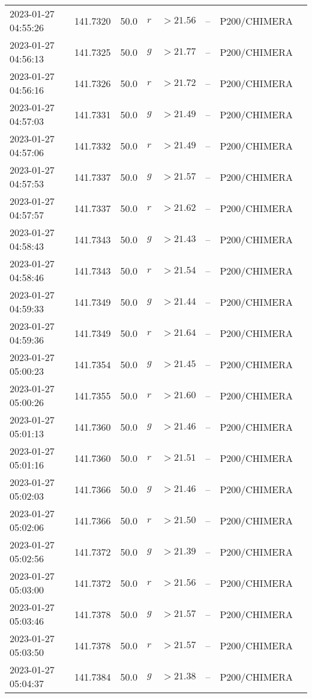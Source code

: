 \documentclass{nature_plusfigure}
\begin{document}
\begin{supplement}
\begin{center}
\begin{longtable}{llllllll}
2023-01-27 04:55:26 & 141.7320 & 50.0 & $r$ & $>21.56$ & -- & P200/CHIMERA &  \\ 
2023-01-27 04:56:13 & 141.7325 & 50.0 & $g$ & $>21.77$ & -- & P200/CHIMERA &  \\ 
2023-01-27 04:56:16 & 141.7326 & 50.0 & $r$ & $>21.72$ & -- & P200/CHIMERA &  \\ 
2023-01-27 04:57:03 & 141.7331 & 50.0 & $g$ & $>21.49$ & -- & P200/CHIMERA &  \\ 
2023-01-27 04:57:06 & 141.7332 & 50.0 & $r$ & $>21.49$ & -- & P200/CHIMERA &  \\ 
2023-01-27 04:57:53 & 141.7337 & 50.0 & $g$ & $>21.57$ & -- & P200/CHIMERA &  \\ 
2023-01-27 04:57:57 & 141.7337 & 50.0 & $r$ & $>21.62$ & -- & P200/CHIMERA &  \\ 
2023-01-27 04:58:43 & 141.7343 & 50.0 & $g$ & $>21.43$ & -- & P200/CHIMERA &  \\ 
2023-01-27 04:58:46 & 141.7343 & 50.0 & $r$ & $>21.54$ & -- & P200/CHIMERA &  \\ 
2023-01-27 04:59:33 & 141.7349 & 50.0 & $g$ & $>21.44$ & -- & P200/CHIMERA &  \\ 
2023-01-27 04:59:36 & 141.7349 & 50.0 & $r$ & $>21.64$ & -- & P200/CHIMERA &  \\ 
2023-01-27 05:00:23 & 141.7354 & 50.0 & $g$ & $>21.45$ & -- & P200/CHIMERA &  \\ 
2023-01-27 05:00:26 & 141.7355 & 50.0 & $r$ & $>21.60$ & -- & P200/CHIMERA &  \\ 
2023-01-27 05:01:13 & 141.7360 & 50.0 & $g$ & $>21.46$ & -- & P200/CHIMERA &  \\ 
2023-01-27 05:01:16 & 141.7360 & 50.0 & $r$ & $>21.51$ & -- & P200/CHIMERA &  \\ 
2023-01-27 05:02:03 & 141.7366 & 50.0 & $g$ & $>21.46$ & -- & P200/CHIMERA &  \\ 
2023-01-27 05:02:06 & 141.7366 & 50.0 & $r$ & $>21.50$ & -- & P200/CHIMERA &  \\ 
2023-01-27 05:02:56 & 141.7372 & 50.0 & $g$ & $>21.39$ & -- & P200/CHIMERA &  \\ 
2023-01-27 05:03:00 & 141.7372 & 50.0 & $r$ & $>21.56$ & -- & P200/CHIMERA &  \\ 
2023-01-27 05:03:46 & 141.7378 & 50.0 & $g$ & $>21.57$ & -- & P200/CHIMERA &  \\ 
2023-01-27 05:03:50 & 141.7378 & 50.0 & $r$ & $>21.57$ & -- & P200/CHIMERA &  \\ 
2023-01-27 05:04:37 & 141.7384 & 50.0 & $g$ & $>21.38$ & -- & P200/CHIMERA &  \\ 

\end{longtable}
\end{center}
\end{supplement}
\end{document}
